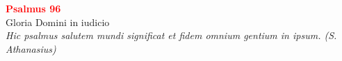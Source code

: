 


\def\greinitialformat#1{%
{\fontsize{39}{39}\selectfont #1}%
}




\vspace{0.3cm}
\begin{center}
 \textcolor{red}{\large \bf Psalmus 96}\\
Gloria Domini in iudicio\\
\textit{\small Hic psalmus salutem mundi significat et fidem omnium gentium in ipsum. (S. Athanasius)}
\end{center}
